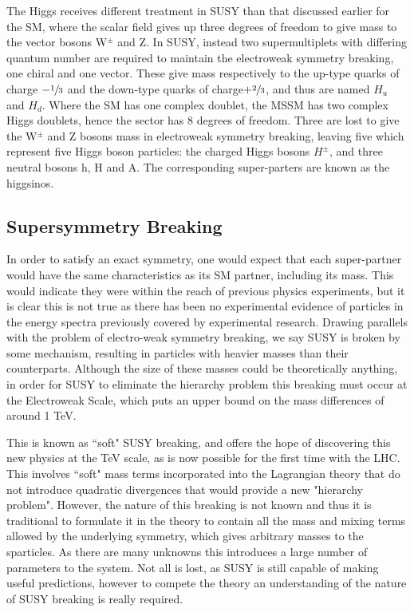 The Higgs receives different treatment in SUSY than that discussed earlier for the SM, where the scalar field gives up three degrees of freedom to give mass to the vector bosons W$^{\pm}$ and Z. In SUSY, instead two supermultiplets with differing quantum number are required to maintain the electroweak symmetry breaking, one chiral and one vector. These give mass respectively to the up-type quarks of charge $-\sfrac{1}{3}$ and the down-type quarks of charge$+\sfrac{2}{3}$, and thus are named $H_{u}$ and $H_{d}$\cite{SUSYsuch}. Where the SM has one complex doublet, the MSSM has two complex Higgs doublets, hence the sector has 8 degrees of freedom. Three are lost to give the W$^{\pm}$ and Z bosons mass in electroweak symmetry breaking, leaving five which represent five Higgs boson particles: the charged Higgs bosons $H^{\pm}$, and three neutral bosons h, H and A. The corresponding super-parters are known as the higgsinos.  


\subsection{Supersymmetry Breaking}

In order to satisfy an exact symmetry, one would expect that each super-partner would have the same characteristics as its SM partner, including its mass. This would indicate they were within the reach of previous physics experiments, but it is clear this is not true as there has been no experimental evidence of particles in the energy spectra previously covered by experimental research. Drawing parallels with the problem of electro-weak symmetry breaking, we say SUSY is broken by some mechanism, resulting in particles with heavier masses than their counterparts. Although the size of these masses could be theoretically anything, in order for SUSY to eliminate the hierarchy problem this breaking must occur at the Electroweak Scale, which puts an upper bound on the mass differences of around 1 TeV.  

This is known as ``soft" SUSY breaking, and offers the hope of discovering this new physics at the TeV scale, as is now possible for the first time with the LHC. This involves ``soft" mass terms incorporated into the Lagrangian theory that do not introduce quadratic divergences that would provide a new "hierarchy problem". However, the nature of this breaking is not known and thus it is traditional to formulate it in the theory to contain all the mass and mixing terms allowed by the underlying symmetry, which gives arbitrary masses to the sparticles. As there are many unknowns this introduces a large number of parameters to the system. Not all is lost, as SUSY is still capable of making useful predictions, however to compete the theory an understanding of the nature of SUSY breaking is really required. 

